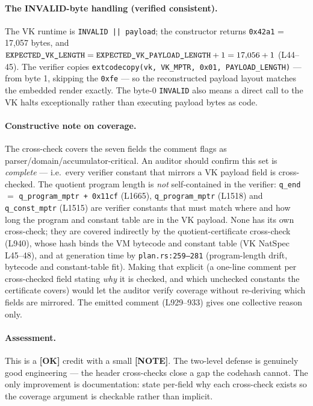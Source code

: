 \paragraph{The INVALID-byte handling (verified consistent).}
The VK runtime is \texttt{INVALID || payload}; the constructor
returns \texttt{0x42a1} = 17{,}057 bytes, and
$\texttt{EXPECTED\_\allowbreak{}VK\_\allowbreak{}LENGTH} = \texttt{EXPECTED\_\allowbreak{}VK\_\allowbreak{}PAYLOAD\_\allowbreak{}LENGTH}
+ 1 = 17{,}056 + 1$ (L44--45). The verifier copies
\texttt{extcodecopy(vk, VK\_\allowbreak{}MPTR, 0x01, PAYLOAD\_\allowbreak{}LENGTH)} ---
from byte 1, skipping the \texttt{0xfe} --- so the reconstructed
payload layout matches the embedded render exactly. The byte-0
\texttt{INVALID} also means a direct call to the VK halts
exceptionally rather than executing payload bytes as code.

\paragraph{Constructive note on coverage.}
The cross-check covers the seven fields the comment flags as
parser/domain/accumulator-critical. An auditor should confirm
this set is \emph{complete} --- i.e.\ every verifier constant
that mirrors a VK payload field is cross-checked.
 The quotient program length is \emph{not}
self-contained in the verifier: \texttt{q\_end} $=$
\texttt{q\_\allowbreak{}program\_\allowbreak{}mptr + 0x11cf} (L1665), \texttt{q\_program\_mptr}
(L1518) and \texttt{q\_const\_mptr} (L1515) are verifier constants
that must match where and how long the program and constant table
are in the VK payload. None has its own cross-check; they are
covered indirectly by the quotient-certificate cross-check (L940),
whose hash binds the VM bytecode and constant table (VK NatSpec
L45--48), and at generation time by \texttt{plan.rs:259--281}
(program-length drift, bytecode and constant-table fit). Making
that explicit (a one-line comment per cross-checked field stating
\emph{why} it is checked, and which unchecked constants the
certificate covers) would let the auditor verify coverage without
re-deriving which fields are mirrored.  The emitted
comment (L929--933) gives one collective reason only.

\paragraph{Assessment.} This is a
\textcolor{tracegreen}{\textbf{[OK]}} credit with a small
\textcolor{mathpurple}{\textbf{[NOTE]}}. The two-level defense
is genuinely good engineering --- the header cross-checks close a
gap the codehash cannot. The only improvement is documentation:
state per-field why each cross-check exists so the coverage
argument is checkable rather than implicit.


